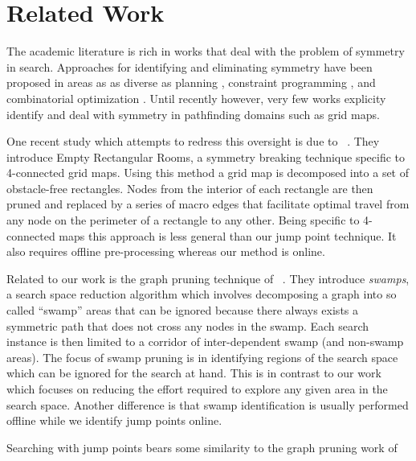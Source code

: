 \section{Related Work}
\label{sec:relatedwork}
The academic literature is rich in works that deal with the problem of symmetry
in search.  Approaches for identifying and eliminating symmetry have been
proposed in areas as as diverse as planning \cite{fox99}, constraint programming
\cite{gent00}, and combinatorial optimization \cite{fukunaga08}. Until recently
however, very few works explicity identify and deal with symmetry in pathfinding
domains such as grid maps.
\par
One recent study which attempts to redress this oversight is due to
\citeauthor{harabor10}~.  They introduce Empty Rectangular
Rooms, a symmetry breaking technique specific to 4-connected grid maps.  Using
this method a grid map is  decomposed into a set of obstacle-free rectangles.
Nodes from the interior of each rectangle are then pruned and replaced by a
series of macro edges that facilitate optimal travel from any node on the
perimeter of a rectangle to any other.  Being specific to 4-connected maps this
approach is less general than our jump point technique. It also requires offline
pre-processing whereas our method is online.
\par
Related to our work is the graph pruning technique of
\citeauthor{pochter10}~.  They introduce \emph{swamps}, a
search space reduction algorithm which involves decomposing a graph into so
called ``swamp'' areas that can be ignored because there always exists a
symmetric path that does not cross any nodes in the swamp.  Each search instance
is then limited to a corridor of inter-dependent swamp (and non-swamp areas).
The focus of swamp pruning is in identifying regions of
the search space which can be ignored for the search at hand.  This is in
contrast to our work which focuses on reducing the effort required to explore
any given area in the search space.  Another difference is that swamp
identification is usually performed offline while we identify jump points
online.
\par
Searching with jump points bears some similarity to the graph pruning work of
